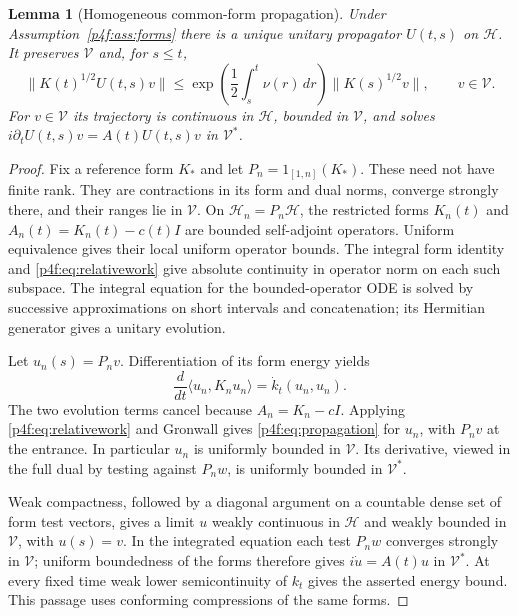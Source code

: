 \documentclass[11pt]{article}
\numberwithin{equation}{section}
\newtheorem{lemma}[theorem]{Lemma}
\theoremstyle{definition}
\theoremstyle{remark}
\begin{document}
\begin{lemma}[Homogeneous common-form propagation]
\label{p4f:lem:propagation}
Under Assumption~\ref{p4f:ass:forms} there is a unique unitary
propagator $U(t,s)$ on $\mathcal H$. It preserves $\mathcal V$
and, for $s\le t$,
\begin{equation}\label{p4f:eq:propagation}
 \|K(t)^{1/2}U(t,s)v\|
 \le \exp\!\left(\frac12\int_s^t\nu(r)\,dr\right)
                 \|K(s)^{1/2}v\|,\qquad v\in\mathcal V.
\end{equation}
For $v\in\mathcal V$ its trajectory is continuous in
$\mathcal H$, bounded in $\mathcal V$, and solves
$i\partial_t U(t,s)v=A(t)U(t,s)v$ in $\mathcal V^*$.
\end{lemma}

\begin{proof}
Fix a reference form $K_*$ and let
$P_n=1_{[1,n]}(K_*)$. These need not have finite rank.
They are contractions in its form and dual norms, converge
strongly there, and their ranges lie in $\mathcal V$.
On $\mathcal H_n=P_n\mathcal H$, the restricted forms
$K_n(t)$ and $A_n(t)=K_n(t)-c(t)I$ are bounded
self-adjoint operators. Uniform equivalence gives their
local uniform operator bounds. The integral form identity
and \eqref{p4f:eq:relativework} give absolute continuity in
operator norm on each such subspace. The integral equation
for the bounded-operator ODE is solved by successive
approximations on short intervals and concatenation; its
Hermitian generator gives a unitary evolution.

Let $u_n(s)=P_nv$. Differentiation of its form energy yields
\[
 \frac d{dt}\langle u_n,K_nu_n\rangle
       =\dot k_t(u_n,u_n).
\]
The two evolution terms cancel because
$A_n=K_n-cI$. Applying \eqref{p4f:eq:relativework}
and Gronwall gives \eqref{p4f:eq:propagation} for $u_n$,
with $P_nv$ at the entrance. In particular $u_n$ is
uniformly bounded in $\mathcal V$. Its derivative,
viewed in the full dual by testing against $P_nw$,
is uniformly bounded in $\mathcal V^*$.

Weak compactness, followed by a diagonal argument on a
countable dense set of form test vectors, gives a limit
$u$ weakly continuous in $\mathcal H$ and weakly bounded
in $\mathcal V$, with $u(s)=v$. In the integrated
equation each test $P_nw$ converges strongly in
$\mathcal V$; uniform boundedness of the forms therefore
gives $i\dot u=A(t)u$ in $\mathcal V^*$.
At every fixed time weak lower semicontinuity of $k_t$
gives the asserted energy bound. This passage uses
conforming compressions of the same forms.


\end{proof}
\end{document}
